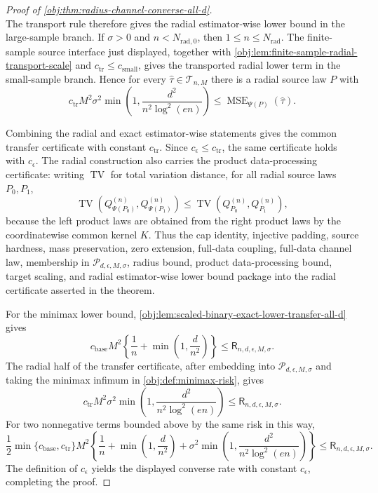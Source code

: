 \begin{proof}[Proof of \cref{obj:thm:radius-channel-converse-all-d}]
\[\]
The transport rule therefore gives the radial estimator-wise lower bound in the large-sample branch.  If \(\sigma>0\) and \(n<N_{\mathrm{rad},0}\), then \(1\le n\le N_{\mathrm{rad}}\).  The finite-sample source interface just displayed, together with \cref{obj:lem:finite-sample-radial-transport-scale} and \(c_{\mathrm{tr}}\le c_{\mathrm{small}}\), gives the transported radial lower term in the small-sample branch.  Hence for every \(\widehat\tau\in\mathcal T_{n,M}\) there is a radial source law \(P\) with
\[
c_{\mathrm{tr}}M^2\sigma^2
\min\left(1,\frac{d^2}{n^2\log^2(en)}\right)
\le
\operatorname{MSE}_{\Psi(P)}(\widehat\tau).
\]

Combining the radial and exact estimator-wise statements gives the common transfer certificate with constant \(c_{\mathrm{tr}}\).  Since \(c_\epsilon\le c_{\mathrm{tr}}\), the same certificate holds with \(c_\epsilon\).  The radial construction also carries the product data-processing certificate: writing \(\operatorname{TV}\) for total variation distance, for all radial source laws \(P_0,P_1\),
\[
\operatorname{TV}\!\left(Q_{\Psi(P_0)}^{(n)},Q_{\Psi(P_1)}^{(n)}\right)
\le
\operatorname{TV}\!\left(Q_{P_0}^{(n)},Q_{P_1}^{(n)}\right),
\]
because the left product laws are obtained from the right product laws by the coordinatewise common kernel \(K\).  Thus the cap identity, injective padding, source hardness, mass preservation, zero extension, full-data coupling, full-data channel law, membership in \(\mathcal P_{d,\epsilon,M,\sigma}\), radius bound, product data-processing bound, target scaling, and radial estimator-wise lower bound package into the radial certificate asserted in the theorem.

For the minimax lower bound, \cref{obj:lem:scaled-binary-exact-lower-transfer-all-d} gives
\[
c_{\mathrm{base}}M^2
\left\{\frac1n+\min\left(1,\frac d{n^2}\right)\right\}
\le
\mathsf R_{n,d,\epsilon,M,\sigma}.
\]
The radial half of the transfer certificate, after embedding into \(\mathcal P_{d,\epsilon,M,\sigma}\) and taking the minimax infimum in \cref{obj:def:minimax-risk}, gives
\[
c_{\mathrm{tr}}M^2\sigma^2
\min\left(1,\frac{d^2}{n^2\log^2(en)}\right)
\le
\mathsf R_{n,d,\epsilon,M,\sigma}.
\]
For two nonnegative terms bounded above by the same risk in this way,
\[
\frac12\min\{c_{\mathrm{base}},c_{\mathrm{tr}}\}M^2
\left\{
\frac1n+\min\left(1,\frac d{n^2}\right)
+\sigma^2\min\left(1,\frac{d^2}{n^2\log^2(en)}\right)
\right\}
\le
\mathsf R_{n,d,\epsilon,M,\sigma}.
\]
The definition of \(c_\epsilon\) yields the displayed converse rate with constant \(c_\epsilon\), completing the proof. %
\end{proof}
